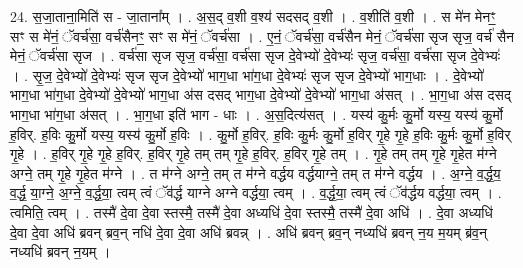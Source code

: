 \documentclass[17pt]{extarticle}
\begin{document}
24. स॒जा॒ताना॒मिति॑ स - जा॒ताना᳚म् । . अ॒स॒द् व॒शी व॒श्य॑ सदसद् व॒शी । . व॒शीति॑ व॒शी । . स मे॑न मेनꣳ॒॒ सꣳ स मे॑नं॒ ॅवर्च॑सा॒ वर्च॑सैनꣳ॒॒ सꣳ स मे॑नं॒ ॅवर्च॑सा । . ए॒नं॒ ॅवर्च॑सा॒ वर्च॑सैन मेनं॒ ॅवर्च॑सा सृज सृज॒ वर्च॑ सैन मेनं॒ ॅवर्च॑सा सृज । . वर्च॑सा सृज सृज॒ वर्च॑सा॒ वर्च॑सा सृज दे॒वेभ्यो॑ दे॒वेभ्यः॑ सृज॒ वर्च॑सा॒ वर्च॑सा सृज दे॒वेभ्यः॑ । . सृ॒ज॒ दे॒वेभ्यो॑ दे॒वेभ्यः॑ सृज सृज दे॒वेभ्यो॑ भाग॒धा भा॑ग॒धा दे॒वेभ्यः॑ सृज सृज दे॒वेभ्यो॑ भाग॒धाः । . दे॒वेभ्यो॑ भाग॒धा भा॑ग॒धा दे॒वेभ्यो॑ दे॒वेभ्यो॑ भाग॒धा अ॑स दसद् भाग॒धा दे॒वेभ्यो॑ दे॒वेभ्यो॑ भाग॒धा अ॑सत् । . भा॒ग॒धा अ॑स दसद् भाग॒धा भा॑ग॒धा अ॑सत् । . भा॒ग॒धा इति॑ भाग - धाः । . अ॒स॒दित्य॑सत् । . यस्य॑ कु॒र्मः कु॒र्मो यस्य॒ यस्य॑ कु॒र्मो ह॒विर्. ह॒विः कु॒र्मो यस्य॒ यस्य॑ कु॒र्मो ह॒विः । . कु॒र्मो ह॒विर्. ह॒विः कु॒र्मः कु॒र्मो ह॒विर् गृ॒हे गृ॒हे ह॒विः कु॒र्मः कु॒र्मो ह॒विर् गृ॒हे । . ह॒विर् गृ॒हे गृ॒हे ह॒विर्. ह॒विर् गृ॒हे तम् तम् गृ॒हे ह॒विर्. ह॒विर् गृ॒हे तम् । . गृ॒हे तम् तम् गृ॒हे गृ॒हेत म॑ग्ने अग्ने॒ तम् गृ॒हे गृ॒हेत म॑ग्ने । . त म॑ग्ने अग्ने॒ तम् त म॑ग्ने वर्द्धय वर्द्धयाग्ने॒ तम् त म॑ग्ने वर्द्धय । . अ॒ग्ने॒ व॒र्द्ध॒य॒ व॒र्द्ध॒ या॒ग्ने॒ अ॒ग्ने॒ व॒र्द्ध॒या॒ त्वम् त्वं ॅव॑र्द्ध याग्ने अग्ने वर्द्धया॒ त्वम् । . व॒र्द्ध॒या॒ त्वम् त्वं ॅव॑र्द्धय वर्द्धया॒ त्वम् । . त्वमिति॒ त्वम् । . तस्मै॑ दे॒वा दे॒वा स्तस्मै॒ तस्मै॑ दे॒वा अध्यधि॑ दे॒वा स्तस्मै॒ तस्मै॑ दे॒वा अधि॑ । . दे॒वा अध्यधि॑ दे॒वा दे॒वा अधि॑ ब्रवन् ब्रव॒न् नधि॑ दे॒वा दे॒वा अधि॑ ब्रवन्न् । . अधि॑ ब्रवन् ब्रव॒न् नध्यधि॑ ब्रवन् न॒य म॒यम् ब्र॑व॒न् नध्यधि॑ ब्रवन् न॒यम् । \newline
\end{document}
